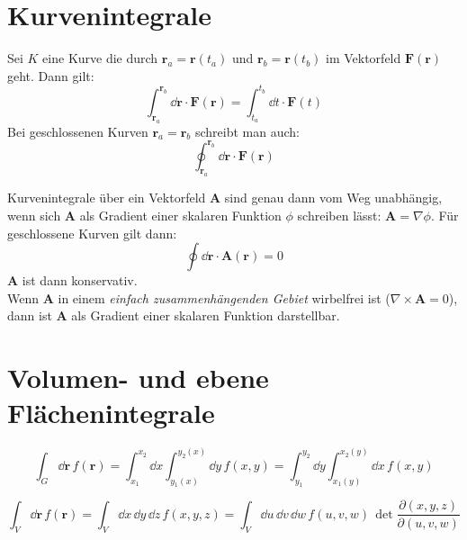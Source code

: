 \newpage 
\section{Kurvenintegrale}

\begin{framedprop}
Sei $K$ eine Kurve die durch $\mathbf{r}_a = \mathbf{r}(t_a)$ und $\mathbf{r}_b = \mathbf{r}(t_b)$ im Vektorfeld $\mathbf{F}(\mathbf{r})$ geht. Dann gilt:
\[
\int_{\mathbf{r}_a}^{\mathbf{r}_b} \dd \mathbf{r} \cdot \mathbf{F}(\mathbf{r}) = \int_{t_a}^{t_b} \dd t \cdot \mathbf{F}(t)
\]
Bei geschlossenen Kurven $\mathbf{r}_a = \mathbf{r}_b$ schreibt man auch:
\[
\oint_{\mathbf{r}_a}^{\mathbf{r}_b} \dd \mathbf{r} \cdot \mathbf{F}(\mathbf{r})
\]
\end{framedprop}

\begin{framedthm}
Kurvenintegrale über ein Vektorfeld $\mathbf{A}$ sind genau dann vom Weg unabhängig, wenn sich $\mathbf{A}$ als Gradient einer skalaren Funktion $\phi$ schreiben lässt: $\mathbf{A} = \nabla \phi$. Für geschlossene Kurven gilt dann: 
\[
\oint \dd \mathbf{r} \cdot \mathbf{A}(\mathbf{r}) = 0
\]
$\mathbf{A}$ ist dann konservativ.\\
Wenn $\mathbf{A}$ in einem \textit{einfach zusammenhängenden Gebiet} wirbelfrei ist ($\nabla \times \mathbf{A} = 0$), dann ist $\mathbf{A}$ als Gradient einer skalaren Funktion darstellbar.
\end{framedthm}

\section{Volumen- und ebene Flächenintegrale}

\begin{framedprop}
\[
\int_{G} \dd\mathbf{r} \, f(\mathbf{r}) = \int_{x_{1}}^{x_{2}} \dd x \int_{y_{1}(x)}^{y_{2}(x)} \dd y \, f(x,y) = \int_{y_{1}}^{y_{2}} \dd y \int_{x_{1}(y)}^{x_{2}(y)} \dd x \, f(x,y)
\]
\end{framedprop}

\begin{framedprop}
\[
\int_{V} \dd \mathbf{r} \, f(\mathbf{r}) = \int_{V} \dd x \, \dd y \, \dd z \, f(x,y,z) = \int_{V} \dd u \, \dd v \, \dd w \, f(u,v,w) \, \det\frac{\partial(x,y,z)}{\partial(u,v,w)}
\]
\end{framedprop}

